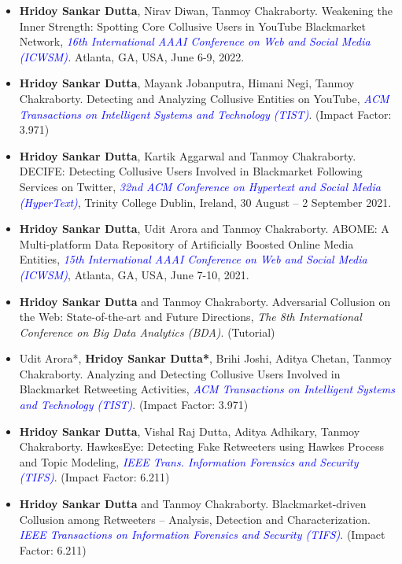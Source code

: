 \documentclass[margin, centered]{res}
\begin{document}
\begin{resume}
\begin{itemize}[leftmargin=*]
\item \textbf{Hridoy Sankar Dutta}, Nirav Diwan, Tanmoy Chakraborty. Weakening the Inner Strength: Spotting Core Collusive Users in YouTube Blackmarket Network,  \textit{\textcolor{blue}{16th International AAAI Conference on Web and Social Media (ICWSM)}.} Atlanta, GA, USA, June 6-9, 2022.  

\item \textbf{Hridoy Sankar Dutta}, Mayank Jobanputra, Himani Negi, Tanmoy Chakraborty. Detecting and Analyzing Collusive Entities on YouTube,   \textit{\textcolor{blue}{ACM Transactions on Intelligent Systems and Technology (TIST)}}. (Impact Factor: 3.971)

\item \textbf{Hridoy Sankar Dutta}, Kartik Aggarwal and Tanmoy Chakraborty. DECIFE: Detecting Collusive Users Involved in Blackmarket Following Services on Twitter, \textit{\textcolor{blue}{32nd ACM Conference on Hypertext and Social Media (HyperText)}}, Trinity College Dublin, Ireland,  30 August – 2 September 2021.

\item \textbf{Hridoy Sankar Dutta}, Udit Arora and Tanmoy Chakraborty. ABOME: A Multi-platform Data Repository of Artificially Boosted Online Media Entities, \textit{\textcolor{blue}{15th International AAAI Conference on Web and Social Media (ICWSM)}}, Atlanta, GA, USA, June 7-10, 2021.

\item \textbf{Hridoy Sankar Dutta} and Tanmoy Chakraborty. Adversarial Collusion on the Web: State-of-the-art and Future Directions,  \textit{The 8th International Conference on Big Data Analytics (BDA)}. (Tutorial)

\item Udit Arora*, \textbf{Hridoy Sankar Dutta*}, Brihi Joshi, Aditya Chetan, Tanmoy Chakraborty. Analyzing and Detecting Collusive Users Involved in Blackmarket Retweeting Activities,  \textit{\textcolor{blue}{ACM Transactions on Intelligent Systems and Technology (TIST)}}. (Impact Factor: 3.971)

\item \textbf{Hridoy Sankar Dutta}, Vishal Raj Dutta, Aditya Adhikary, Tanmoy Chakraborty. HawkesEye: Detecting Fake Retweeters using Hawkes Process and Topic Modeling,  \textit{\textcolor{blue}{IEEE Trans. Information Forensics and Security (TIFS)}}. (Impact Factor: 6.211)

\item \textbf{Hridoy Sankar Dutta} and Tanmoy Chakraborty. Blackmarket-driven Collusion among Retweeters – Analysis, Detection and Characterization. \textit{\textcolor{blue}{IEEE Transactions on Information Forensics and Security (TIFS)}}. (Impact Factor: 6.211)


\end{itemize}
\end{resume}
\end{document}
